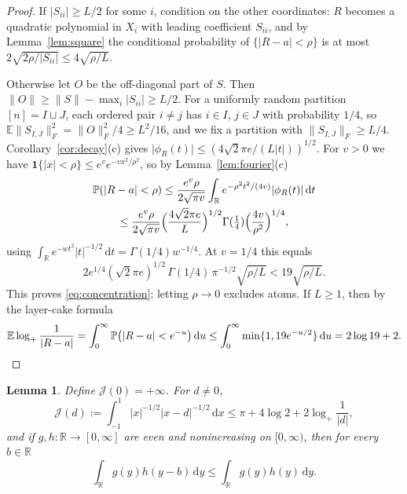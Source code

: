 \documentclass[11pt]{amsart}
\numberwithin{equation}{section}
\newtheorem{lemma}[theorem]{Lemma}
\theoremstyle{definition}
\theoremstyle{remark}
\newcommand{\R}{\mathbb R}
\newcommand{\E}{\mathbb E}
\newcommand{\PP}{\mathbb P}
\newcommand{\1}{\mathbf 1}
\newcommand{\dd}{\,\mathrm d}
\newcommand{\logp}{\log_+}
\newcommand{\norm}[1]{\lVert #1\rVert}
\newcommand{\abs}[1]{\lvert #1\rvert}
\begin{document}
\begin{proof}
If $\abs{S_{ii}}\ge L/2$ for some $i$, condition on the other coordinates: $R$ becomes a quadratic polynomial in $X_i$ with leading coefficient $S_{ii}$, and by Lemma~\ref{lem:square} the conditional probability of $\{\abs{R-a}<\rho\}$ is at most $2\sqrt{2\rho/\abs{S_{ii}}}\le4\sqrt{\rho/L}$.

Otherwise let $O$ be the off-diagonal part of $S$. Then $\norm O\ge\norm S-\max_i\abs{S_{ii}}\ge L/2$. For a uniformly random partition $[n]=I\sqcup J$, each ordered pair $i\ne j$ has $i\in I$, $j\in J$ with probability $1/4$, so $\E\norm{S_{I,J}}_F^2=\norm O_F^2/4\ge L^2/16$, and we fix a partition with $\norm{S_{I,J}}_F\ge L/4$. Corollary~\ref{cor:decay}(c) gives $\abs{\phi_R(t)}\le(4\sqrt2\pi e/(L\abs t))^{1/2}$. For $v>0$ we have $\1\{\abs x<\rho\}\le e^{v}e^{-vx^2/\rho^2}$, so by Lemma~\ref{lem:fourier}(c)
\begin{multline*}
\PP(\abs{R-a}<\rho)\le\frac{e^v\rho}{2\sqrt{\pi v}}\int_\R e^{-\rho^2t^2/(4v)}\abs{\phi_R(t)}\dd t\\
\le\frac{e^v\rho}{2\sqrt{\pi v}}\Bigl(\frac{4\sqrt2\pi e}{L}\Bigr)^{1/2}\Gamma(\tfrac14)\Bigl(\frac{4v}{\rho^2}\Bigr)^{1/4},
\end{multline*}
using $\int_\R e^{-wt^2}\abs t^{-1/2}\dd t=\Gamma(1/4)w^{-1/4}$. At $v=1/4$ this equals
\[
2e^{1/4}(\sqrt2\pi e)^{1/2}\,\Gamma(1/4)\,\pi^{-1/2}\sqrt{\rho/L}<19\sqrt{\rho/L}.
\]
This proves \eqref{eq:concentration}; letting $\rho\to0$ excludes atoms. If $L\ge1$, then by the layer-cake formula
\[
\E\logp\frac1{\abs{R-a}}=\int_0^\infty\PP\bigl(\abs{R-a}<e^{-u}\bigr)\dd u\le\int_0^\infty\min\{1,19e^{-u/2}\}\dd u=2\log19+2 .\qedhere
\]
\end{proof}

\begin{lemma}\label{lem:kernels}
Define $\mathcal J(0)=+\infty$. For $d\ne0$,
\begin{equation}\label{eq:J}
\mathcal J(d):=\int_{-1}^1\abs x^{-1/2}\abs{x-d}^{-1/2}\dd x\le\pi+4\log2+2\logp\frac1{\abs d},
\end{equation}
and if $g,h:\R\to[0,\infty]$ are even and nonincreasing on $[0,\infty)$, then for every $b\in\R$
\begin{equation}\label{eq:rearrange}
\int_\R g(y)h(y-b)\dd y\le\int_\R g(y)h(y)\dd y .
\end{equation}
\end{lemma}
\end{document}
